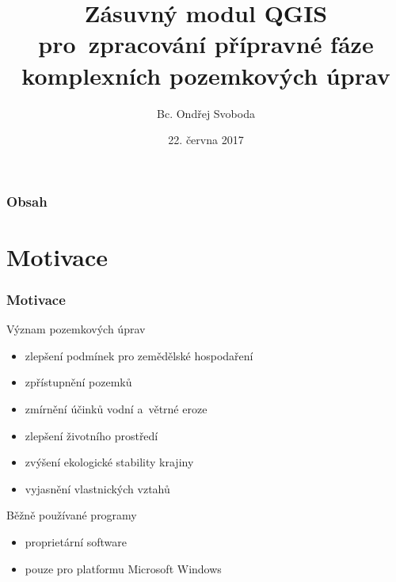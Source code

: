 \documentclass{beamer}
\title[]{Zásuvný modul QGIS pro~zpracování přípravné fáze komplexních pozemkových úprav} %
\author{Bc. Ondřej Svoboda} %
\institute[ČVUT] %
{
České vysoké učení technické v Praze \\ %
Fakulta stavební \\
Obor Geomatika
}
\date{22. června 2017} %
\begin{document}
\begin{frame}
\titlepage %
\end{frame}

\begin{frame}
\frametitle{Obsah} %
\tableofcontents %
\end{frame}


\section{Motivace} %

\begin{frame}

\frametitle{Motivace}

Význam pozemkových úprav
\begin{itemize}
	\item zlepšení podmínek pro zemědělské hospodaření
	\item zpřístupnění pozemků
	\item zmírnění účinků vodní a~větrné eroze
	\item zlepšení životního prostředí
	\item zvýšení ekologické stability krajiny
	\item vyjasnění vlastnických vztahů
\end{itemize}

\bigskip

Běžně používané programy
\begin{itemize}
	\item proprietární software
	\item pouze pro platformu Microsoft Windows
\end{itemize}

\end{frame}
\end{document}
